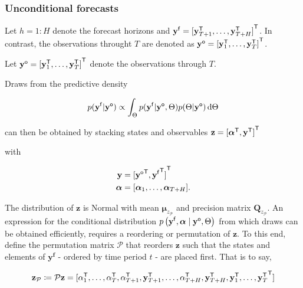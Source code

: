 \documentclass[notitlepage,a4paper,12pt]{article}
\newcommand{\transpose}[1]{{#1}^{\sf{T}}}
\begin{document}
\subsubsection{Unconditional forecasts}\label{sec:uncondfcast}

Let $h = 1:H$ denote the forecast horizons and $\mathbf{y}^{\sf{f}} = \transpose{[\mathbf{y}^{\sf{T}}_{T+1}, \dots, \mathbf{y}^{\sf{T}}_{T+H}]}$. In contrast, the observations throught $T$ are denoted as $\mathbf{y}^{\sf{o}} = \transpose{[\mathbf{y}^{\sf{T}}_{1}, \dots, \mathbf{y}^{\sf{T}}_{T}]}$. 

Let $\mathbf{y}^{\sf{o}} = \transpose{[\mathbf{y}^{\sf{T}}_{1}, \dots, \mathbf{y}^{\sf{T}}_{T}]}$ denote the observations through $T$.

Draws from the predictive density 

$$
p(\mathbf{y^{\sf{f}}}|\mathbf{y^{\sf{o}}}) \propto \int_{\Theta} p(\mathbf{y^{\sf{f}}}|\mathbf{y^{\sf{o}}}, \Theta) p(\Theta|\mathbf{y^{\sf{o}}})\, \text{d}\Theta
$$

can then be obtained by stacking states and observables  $\mathbf{z} = \transpose{[\transpose{\boldsymbol{\alpha}}, \transpose{\mathbf{y}}]}$ 

with 

\begin{align*}
    \mathbf{y} &= \transpose{[\transpose{\mathbf{y}^{\sf{o}}}, \transpose{\mathbf{y}^{\sf{f}}}]} \\
    \boldsymbol{\alpha} &= [\boldsymbol{\alpha}_1, \dots, \boldsymbol{\alpha}_{T+H}].
\end{align*}

The distribution of $\mathbf{z}$ is Normal with mean $\boldsymbol{\mu}_{z_\mathcal{P}}$ and precision matrix $\mathbf{Q}_{z_\mathcal{P}}$. An expression for the conditional distribution $p\left(\mathbf{y}^{\sf{f}}, \boldsymbol{\alpha} \mid \mathbf{y}^{\sf{o}}, \Theta \right)$ from which draws can be obtained efficiently, requires a reordering or permutation of $\mathbf{z}$. To this end, define the permutation matrix $\mathcal{P}$ that reorders $\mathbf{z}$ such that the states and elements of $\mathbf{y^f}$ - ordered by time period $t$ - are placed first. That is to say,

\begin{equation*}
\mathbf{z_{\mathcal{P}}} \coloneqq \mathcal{P} \mathbf{z} 
=
 \transpose{[
     \alpha^{\sf{T}}_1, 
     \dots, 
     \alpha^{\sf{T}}_T, 
     \alpha^{\sf{T}}_{T+1}, 
     \mathbf{y}^{\sf{T}}_{T+1}, 
     \dots, 
     \alpha^{\sf{T}}_{T+H}, 
     \mathbf{y}^{\sf{T}}_{T+H},
     \mathbf{y}^{\sf{T}}_1,
     \dots,
     \mathbf{y}^{\sf{T}}_T}]
\end{equation*}
\end{document}
